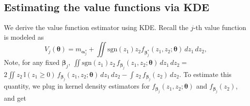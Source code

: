 \documentclass{article}
\newcommand{\bs}{ \boldsymbol}
\newcommand{\txt}{\text}
\newcommand{\lt}{\left}
\newcommand{\rt}{\right}
\newcommand{\tsgn}{\txt{sgn}}
\begin{document}
\begin{appendices}
\section{Estimating the value functions via KDE}
We derive the value function estimator using KDE. Recall the $j$-th value function is modeled as $$V_j\lt(\bs{\theta}\rt) = m_{\bs{\alpha}^*_j}+ \iint \tsgn\lt(z_1\rt)z_2 f_{\bs{\beta}^*_j}\lt(z_1, z_2; \bs{\theta}\rt) \,dz_1 \,dz_2,$$ 
Note, for any fixed $\bs{\beta}_j$, {\small$\iint\text{sgn}(z_1)z_2\,f_{\bs{\beta}_j}\left(z_1,z_2;\bs{\theta}\right)\,dz_1\,dz_2 =$\\$2\iint z_2\,\mathbb{I}\left(z_1\ge0\right)\,f_{\bs{\beta}_j}\left(z_1, z_2;\bs{\theta}\right)\,dz_1\,dz_2-\int z_2\,f_{\bs{\beta}_{j}}\left(z_2\right)\,dz_2.$} To estimate this quantity, we plug in kernel density estimators for $f_{\bs{\beta}_j}(z_1, z_2; \bs{\theta})$
and $f_{\bs{\beta}_j}( z_2 )$, and get


\end{appendices}
\end{document}
